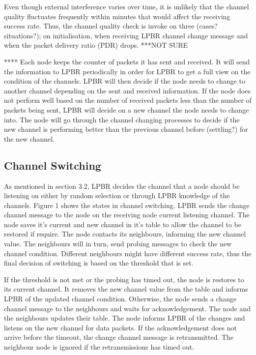 Even though external interference varies over time, it is unlikely that the channel quality fluctuates frequently within minutes that would affect the receiving success rate. Thus, the channel quality check is invoke on three (cases? situations?); on initialisation, when receiving LPBR channel change message and when the packet delivery ratio (PDR) drops. ***NOT SURE  


****
Each node keeps the counter of packets it has sent and received. It will send the information to LPBR periodically in order for LPBR to get a full view on the condition of the channels. LPBR will then decide if the node needs to change to another channel depending on the sent and received information. If the node does not perform well based on the number of received packets less than the number of packets being sent, LPBR will decide on a new channel the node needs to change into. The node will go through the channel changing processes to decide if the new channel is performing better than the previous channel before (settling?) for the new channel.

\subsection{Channel Switching}



As mentioned in section 3.2, LPBR decides the channel that a node should be listening on either by random selection or through LPBR knowledge of the channels. Figure 1 shows the states in channel switching. LPBR sends the change channel message to the node on the receiving node current listening channel. The node saves it's current and new channel in it's table to allow the channel to be restored if require. The node contacts its neighbours, informing the new channel value. The neighbours will in turn, send probing messages to check the new channel condition. Different neighbours might have different success rate, thus the final decision of switching is based on the threshold that is set. 

If the threshold is not met or the probing has timed out, the node is restores to its current channel. It removes the new channel value from the table and informs LPBR of the updated channel condition. Otherwise, the node sends a change channel message to the neighbours and waits for acknowledgement. The node and the neighbours updates their table. The node informs LPBR of the changes and listens on the new channel for data packets. If the acknowledgement does not arrive before the timeout, the change channel message is retransmitted. The neighbour node is ignored if the retransmissions has timed out. 

